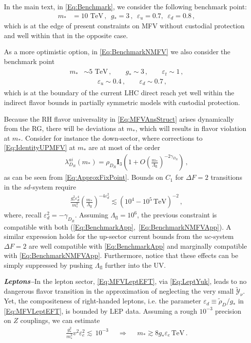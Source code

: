 \documentclass[aps,prl,twocolumn,showpacs,10pt,preprintnumbers,nofootinbib]{revtex4-2}
\newcommand{\TeV}{\,\mathrm{TeV}}
\newcommand{\gst}{g_*}
\newcommand{\mst}{m_*}
\newcommand{\eu}{\varepsilon_{u}}
\newcommand{\et}{\varepsilon_{t}}
\newcommand{\ed}{\varepsilon_{d}}
\newcommand{\Lfl}{\Lambda_{\text{fl}}}
\begin{document}
{In the main text, in \eqref{Eq:Benchmark}, we consider the following benchmark point:
\begin{align}\label{Eq:BenchmarkApp}
    m_* &= 10\,\TeV\,, \,\,\,\gst = 3\,, \,\,\, \eu= 0.7,\,\,\,\ed=0.8\,,
\end{align}
which is at the edge of present constraints on MFV without custodial protection and well within that in the opposite case.

As a more optimistic option, in \eqref{Eq:BenchmarkNMFV} we also consider the benchmark point
\begin{align}\label{Eq:BenchmarkNMFVApp}
\begin{aligned}
    m_* &\sim 5\,\TeV\,, \qquad \gst \sim 3\,, \qquad \et \sim 1\,,  \\ &\qquad\eu\sim 0.4\,, \qquad \ed\sim 0.7\,,
\end{aligned}
\end{align}
which is at the boundary of the current LHC direct reach yet well within the indirect flavor bounds in partially symmetric models with custodial protection.

Because the RH flavor universality in \eqref{Eq:MFVAnsStruct} arises dynamically from the RG, there will be deviations at $\mst$, which will results in flavor violation at $\mst$. Consider for instance the down-sector, where corrections to \eqref{Eq:IdentityUPMFV} at $\mst$ are at most of the order
\begin{align}
    \lambda_{D_R}^{ai}(\mst) = \rho_{D_R} \mathbf{I}_3 \left(1+O\left(\frac{\mst}{\Lfl}\right)^{-2 \gamma_{D_R}}\right)\,,
\end{align}
as can be seen from \eqref{Eq:ApproxFixPoint}. Bounds on $C_1$ for $\Delta F=2$ transitions in the $sd$-system require \cite{Bona:2024bue}
\begin{align}
    \frac{\gst^2\ed^4}{\mst^2 }\left( \frac{\mst}{\Lfl}\right)^{-4 \ed^2}\lesssim (10^{4}-10^{5} \TeV)^{-2}\,,
\end{align}
where, recall $\ed^2 = - \gamma_{D_R}$. Assuming $\Lfl = 10^6$, the previous constraint is compatible with both (\ref{Eq:BenchmarkApp},~\ref{Eq:BenchmarkNMFVApp}). A similar expression holds for the up-sector current bounds from the $uc$-system $\Delta F=2$ \cite{Bona:2024bue} are well compatible with \eqref{Eq:BenchmarkApp} and marginally compatible with \eqref{Eq:BenchmarkNMFVApp}. Furthermore, notice that these effects can be simply suppressed by pushing $\Lfl$ further into the UV.

\textit{\textbf{Leptons--}}In the lepton sector, \eqref{Eq:MFVLeptEFT}, via \eqref{Eq:LeptYuk}, leads to no dangerous flavor transition in the approximation of neglecting the very small $\tilde{\mathcal{Y}}_{\nu}$. Yet, the compositeness of right-handed leptons, i.e. the parameter $\varepsilon_d \equiv \tilde{\rho}_D/\gst$ in \eqref{Eq:MFVLeptEFT}, is bounded by LEP data. Assuming a rough $10^{-3}$ precision on $Z$ couplings, we can estimate 
\begin{align}\label{Eq:BoundLEP}
\frac{\gst^2}{\mst^2}v^2{\varepsilon}_{e}^2 \lesssim \,10^{-3} &&\Longrightarrow &&\mst\gtrsim 8 \gst \varepsilon_{e}\TeV\,. 
\end{align}

}
\end{document}
